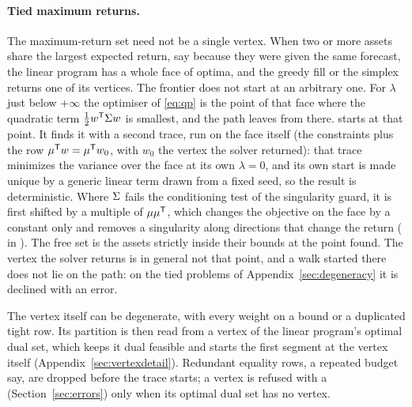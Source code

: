 \paragraph{Tied maximum returns.}
The maximum-return set need not be a single vertex. When two or more assets share the
largest expected return, say because they were given the same forecast, the linear
program has a whole face of optima, and the greedy fill or the simplex returns one of
its vertices. The frontier does not start at an arbitrary one. For $\lambda$ just below
$+\infty$ the optimiser of \eqref{eq:qp} is the point of that face where the quadratic
term $\tfrac12 w^{\mathsf{T}}\Sigma w$ is smallest, and the path leaves from there.
 starts at that point. It finds it with a second trace, run on the face
itself (the constraints plus the row $\mu^{\mathsf{T}} w = \mu^{\mathsf{T}} w_0$, with $w_0$ the
vertex the solver returned): that trace
minimizes the variance over the face at its own $\lambda = 0$, and its own start is made
unique by a generic linear term drawn from a fixed seed, so the result is deterministic.
Where $\Sigma$ fails the conditioning test of the singularity guard, it is first shifted
by a multiple of $\mu\mu^{\mathsf{T}}$, which changes the objective on the face by a constant
only and removes a singularity along directions that change the return
( in ). The free set is
the assets strictly inside their bounds at the point found. The vertex the solver
returns is in general not that point, and a walk started there does not lie on the path:
on the tied problems of Appendix~\ref{sec:degeneracy} it is declined with an error.

The vertex itself can be degenerate, with every weight on a bound or a duplicated tight
row. Its partition is then read from a vertex of the linear program's optimal dual set,
which keeps it dual feasible and starts the first segment at the vertex itself
(Appendix~\ref{sec:vertexdetail}). Redundant equality rows, a repeated budget say, are
dropped before the trace starts; a vertex is refused with a 
(Section~\ref{sec:errors}) only when its optimal dual set has no vertex.
